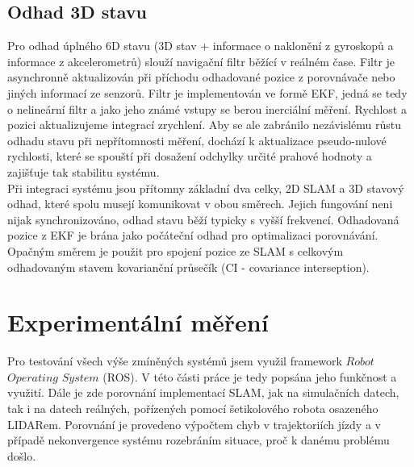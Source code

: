 \documentclass[12pt]{article}
\begin{document}
\subsection{Odhad 3D stavu}
Pro odhad úplného 6D stavu (3D stav + informace o naklonění z gyroskopů a informace z akcelerometrů) slouží navigační filtr běžící v reálném čase. Filtr je asynchronně aktualizován při příchodu odhadované pozice z porovnávače nebo jiných informací ze senzorů. Filtr je implementován ve formě EKF, jedná se tedy o nelineární filtr a jako jeho známé vstupy se berou inerciální měření. Rychlost a pozici aktualizujeme integrací zrychlení. Aby se ale zabránilo nezávislému růstu odhadu stavu při nepřítomnosti měření, dochází k aktualizace pseudo-nulové rychlosti, které se spouští při dosažení odchylky určité prahové hodnoty a zajišťuje tak stabilitu systému.\\
\indent Při integraci systému jsou přítomny základní dva celky, 2D SLAM a 3D stavový odhad, které spolu musejí komunikovat v obou směrech. Jejich fungování neni nijak synchronizováno, odhad stavu běží typicky s vyšší frekvencí. Odhadovaná pozice z EKF je brána jako počáteční odhad pro optimalizaci porovnávání. Opačným směrem je použit pro spojení pozice ze SLAM s celkovým odhadovaným stavem kovarianční průsečík (CI - covariance interseption).


\newpage


\section{Experimentální měření}
Pro testování všech výše zmíněných systémů jsem využil framework $Robot$ $Operating$ $System$ (ROS). V této části práce je tedy popsána jeho funkčnost a využití. Dále je zde porovnání implementací SLAM, jak na simulačních datech, tak i na datech reálných, pořízených pomocí šetikolového robota osazeného LIDARem. Porovnání je provedeno výpočtem chyb v trajektoriích jízdy a v případě nekonvergence systému rozebráním situace, proč k danému problému došlo.
\end{document}
